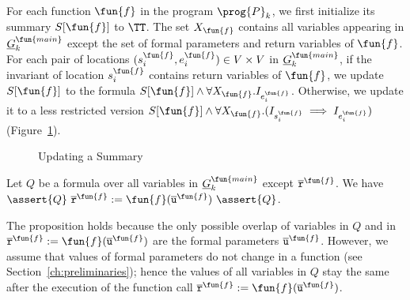 For each function $\fun{f}$ in the program $\prog{P}_k$,
we first initialize its summary $S[\fun{f}]$ to $\TT$.
The set $X_\fun{f}$ contains all variables appearing in
$\underline{G}^{\fun{main}}_k$ except the set of formal parameters and return
variables of $\fun{f}$.
For each pair of locations $(s_i^\fun{f},e_i^\fun{f})\in V\times V$ in $\underline{G}^{\fun{main}}_k$,
if the invariant of location $s_i^\fun{f}$ contains return variables of $\fun{f}$,
we update $S[\fun{f}]$ to the formula $S[\fun{f}]\wedge \forall X_\fun{f}.I_{e_i^\fun{f}}$.
Otherwise, we update it to a less restricted version $S[\fun{f}]\wedge \forall X_\fun{f}. (I_{s_i^\fun{f}} \implies I_{e_i^\fun{f}})$ (Figure~\ref{figure:updating-summary}).

\begin{figure}[t]
  \centering

  \caption{Updating a Summary}
  \label{figure:updating-summary}
\end{figure}
\begin{proposition}
\label{propposition:invariant}
Let $Q$ be a formula over all variables in $\underline{G}^{\fun{main}}_k$ except $\overline{\mathtt{r}}^\fun{f}$.
We have $\assert{Q}\
  \overline{\mathtt{r}}^\fun{f} := \fun{f}
  (\overline{\mathtt{u}}^\fun{f})\ \assert{Q}$.
\end{proposition}
The proposition holds because the only possible overlap of variables in $Q$ and
in $\overline{\mathtt{r}}^\fun{f} := \fun{f} (\overline{\mathtt{u}}^\fun{f})$
are the formal parameters $\overline{\mathtt{u}}^\fun{f}$.
However, we assume that values of formal parameters do not change in a function
(see Section~\ref{ch:preliminaries});
hence the values of all variables in $Q$ stay the same after the execution of
the function call $\overline{\mathtt{r}}^\fun{f} := \fun{f} (\overline{\mathtt{u}}^\fun{f})$.


